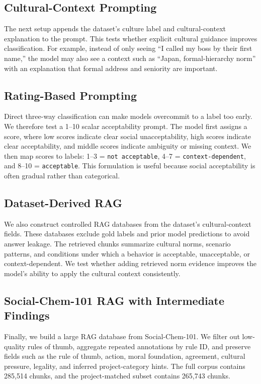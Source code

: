 \subsection{Cultural-Context Prompting}

The next setup appends the dataset's culture label and cultural-context explanation to the prompt. This tests whether explicit cultural guidance improves classification. For example, instead of only seeing ``I called my boss by their first name,'' the model may also see a context such as ``Japan, formal-hierarchy norm'' with an explanation that formal address and seniority are important.

\subsection{Rating-Based Prompting}

Direct three-way classification can make models overcommit to a label too early. We therefore test a 1--10 scalar acceptability prompt. The model first assigns a score, where low scores indicate clear social unacceptability, high scores indicate clear acceptability, and middle scores indicate ambiguity or missing context. We then map scores to labels: 1--3 = \texttt{not acceptable}, 4--7 = \texttt{context-dependent}, and 8--10 = \texttt{acceptable}. This formulation is useful because social acceptability is often gradual rather than categorical.

\subsection{Dataset-Derived RAG}

We also construct controlled RAG databases from the dataset's cultural-context fields. These databases exclude gold labels and prior model predictions to avoid answer leakage. The retrieved chunks summarize cultural norms, scenario patterns, and conditions under which a behavior is acceptable, unacceptable, or context-dependent. We test whether adding retrieved norm evidence improves the model's ability to apply the cultural context consistently.

\subsection{Social-Chem-101 RAG with Intermediate Findings}

Finally, we build a large RAG database from Social-Chem-101. We filter out low-quality rules of thumb, aggregate repeated annotations by rule ID, and preserve fields such as the rule of thumb, action, moral foundation, agreement, cultural pressure, legality, and inferred project-category hints. The full corpus contains 285,514 chunks, and the project-matched subset contains 265,743 chunks.


